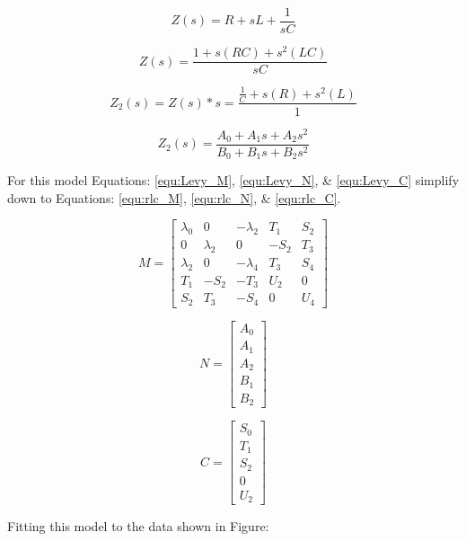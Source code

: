 \begin{equation}
\label{equ:rlc_Zs}
Z(s) = R + sL + \frac{1}{sC}
\end{equation}

\begin{equation}
\label{equ:rlc_Zs2}
Z(s) = \frac{1 + s(RC) + s^2 (LC)}{sC}
\end{equation}

\begin{equation}
\label{equ:rlc_Zs3}
Z_2(s) = Z(s) * s =  \frac{\frac{1}{C} + s(R) + s^2 (L)}{1}
\end{equation}

\begin{equation}
\label{equ:rlc_Zs4}
Z_2(s) = \frac{A_0 + A_1 s + A_2 s^2}{B_0 + B_1 s + B_2 s^2}
\end{equation}

For this model Equations: \eqref{equ:Levy_M}, \eqref{equ:Levy_N}, \& \eqref{equ:Levy_C} simplify down to Equations: \eqref{equ:rlc_M}, \eqref{equ:rlc_N}, \& \eqref{equ:rlc_C}.

\begin{equation}
\label{equ:rlc_M}
M = 
\begin{bmatrix}
\lambda _0 & 0          & -\lambda _2 &  T_1    & S_2 \\
0          & \lambda _2 & 0           & -S_2    & T_3 \\
\lambda _2 & 0          & -\lambda _4 &  T_3    & S_4 \\
T_1        & -S_2       & -T_3        &  U_2    & 0   \\
S_2        &  T_3       & -S_4        &  0      & U_4
\end{bmatrix}
\end{equation}

\begin{multicols}{2}
\begin{equation}
\label{equ:rlc_N}
N = 
\begin{bmatrix}
A_0 \\
A_1 \\
A_2 \\
B_1 \\
B_2
\end{bmatrix}
\end{equation}

\begin{equation}
\label{equ:rlc_C}
C = 
\begin{bmatrix}
S_0 \\
T_1 \\
S_2 \\
0   \\
U_2
\end{bmatrix}
\end{equation}
\end{multicols}

Fitting this model to the data shown in Figure:

